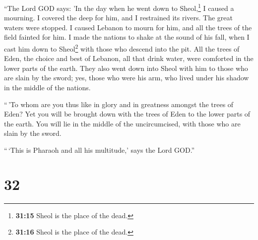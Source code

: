  ``The Lord GOD says: 'In the day when he went down to
Sheol,\footnote{\textbf{31:15} Sheol is the place of the dead.} I caused
a mourning. I covered the deep for him, and I restrained its rivers. The
great waters were stopped. I caused Lebanon to mourn for him, and all
the trees of the field fainted for him.  I made the
nations to shake at the sound of his fall, when I cast him down to
Sheol\footnote{\textbf{31:16} Sheol is the place of the dead.} with
those who descend into the pit. All the trees of Eden, the choice and
best of Lebanon, all that drink water, were comforted in the lower parts
of the earth.  They also went down into Sheol with him to
those who are slain by the sword; yes, those who were his arm, who lived
under his shadow in the middle of the nations.

 ``\,'To whom are you thus like in glory and in greatness
amongst the trees of Eden? Yet you will be brought down with the trees
of Eden to the lower parts of the earth. You will lie in the middle of
the uncircumcised, with those who are slain by the sword.

``\,`This is Pharaoh and all his multitude,' says the Lord GOD.''

\hypertarget{section-30}{%
\section{32}\label{section-30}}

